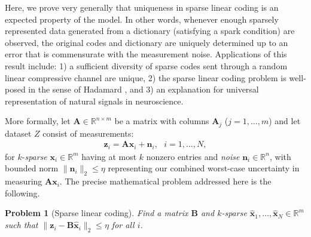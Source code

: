 \documentclass[9pt,twocolumn]{pnas-new}
\newtheorem{problem}{Problem}
\begin{document}
Here, we prove very generally that uniqueness in sparse linear coding is an expected property of the model.  In other words, whenever enough sparsely represented data generated from a dictionary (satisfying a spark condition) are observed, the original codes and dictionary are uniquely determined up to an error that is commensurate with the measurement noise.  Applications of this result include:  1) a sufficient diversity of sparse codes sent through a random linear compressive channel are unique, 2) the sparse linear coding problem is well-posed in the sense of Hadamard \cite{Hadamard1902}, and 3) an explanation for universal representation of natural signals in neuroscience. 




More formally, let $\mathbf{A} \in \mathbb R^{n \times m}$ be a matrix with columns $\mathbf{A}_j$ ($j = 1,\ldots,m$) and let dataset $Z$ consist of measurements:
\begin{align}\label{LinearModel}
\mathbf{z}_i = \mathbf{A}\mathbf{x}_i + \mathbf{n}_i,\ \ \  \text{$i=1,\ldots,N$},
\end{align}
for $k$-\emph{sparse} $\mathbf{x}_i \in \mathbb{R}^m$ having at most $k$ nonzero entries and \emph{noise} $\mathbf{n}_i \in \mathbb{R}^n$, with bounded norm $\| \mathbf{n}_i \|_2 \leq  \eta$ representing our combined worst-case uncertainty in  measuring $\mathbf{A}\mathbf{x}_i$.
The precise mathematical problem addressed here is the following.

\begin{problem}[Sparse linear coding]\label{InverseProblem}
Find a matrix $\mathbf{B}$ and $k$-sparse $\mathbf{\hat x}_1, \ldots, \mathbf{\hat x}_N \in \mathbb{R}^m$ such that $\|\mathbf{z}_i - \mathbf{B}\mathbf{\hat x}_i\|_2 \leq \eta$ for all $i$.
\end{problem}
\end{document}
